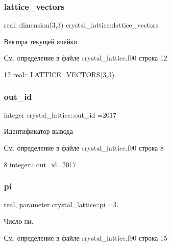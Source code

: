 \subsubsection{\texorpdfstring{lattice\+\_\+vectors}{lattice\_vectors}}
{\footnotesize\ttfamily real, dimension(3,3) crystal\+\_\+lattice\+::lattice\+\_\+vectors}



Вектора текущей ячейки. 



См. определение в файле crystal\+\_\+lattice.\+f90 строка 12


\begin{DoxyCode}
12 \textcolor{keywordtype}{real}:: LATTICE\_VECTORS(3,3)
\end{DoxyCode}
\mbox{\label{namespacecrystal__lattice_a297a8f77c70b997ba6967443326cd549}} 
\subsubsection{\texorpdfstring{out\+\_\+id}{out\_id}}
{\footnotesize\ttfamily integer crystal\+\_\+lattice\+::out\+\_\+id =2017}



Идентификатор вывода 



См. определение в файле crystal\+\_\+lattice.\+f90 строка 8


\begin{DoxyCode}
8 \textcolor{keywordtype}{integer}:: out\_id=2017
\end{DoxyCode}
\mbox{\label{namespacecrystal__lattice_ae015f095c2db99127ae9465dcb443e29}} 
\subsubsection{\texorpdfstring{pi}{pi}}
{\footnotesize\ttfamily real, parameter crystal\+\_\+lattice\+::pi =3.}



Число пи. 



См. определение в файле crystal\+\_\+lattice.\+f90 строка 15


